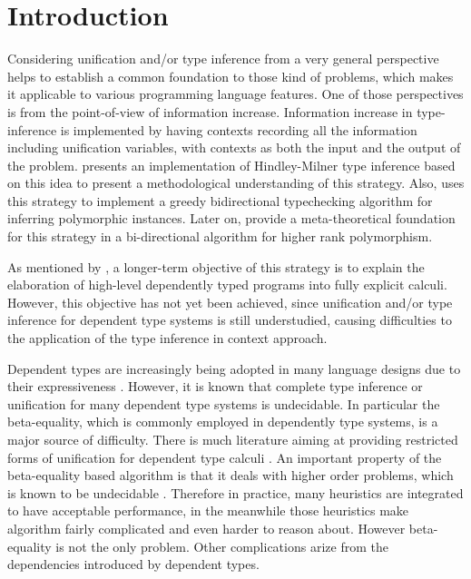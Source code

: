 \section{Introduction}

Considering unification and/or type inference from a very general perspective
helps to establish a common foundation to those kind of problems, which makes it
applicable to various programming language features. One of those
perspectives is from the point-of-view of information 
increase. Information increase in type-inference is implemented by having contexts recording all the
information including unification variables, with contexts as both the input and
the output of the problem. \citet{gundry2010type} presents an implementation of
Hindley-Milner \citep{damas1982principal,hindley69principal} type inference
based on this idea to present a methodological understanding of this strategy.
Also, \citet{dunfield2009greedy} uses this strategy to implement a greedy
bidirectional typechecking algorithm for inferring polymorphic instances. Later
on, \citet{dunfield2013complete} provide a meta-theoretical 
foundation for this strategy in a
bi-directional algorithm for higher rank polymorphism.

As mentioned by \citet{gundry2010type}, a longer-term objective of this strategy
is to explain the elaboration of high-level dependently typed programs into
fully explicit calculi. However, this objective has not yet been
achieved, since unification and/or type inference
for dependent type systems is still understudied, causing difficulties
to the application of the type inference in context approach.

Dependent types are increasingly being adopted in many language designs due to
their expressiveness \citep{xi1999dependent, licata2005formulation,
  pasalic2006concoqtion, mckinna2006dependent, norell2009dependently,
  brady2013idris}. However, it is known that complete type inference or
unification for many dependent type systems is undecidable. In particular the
beta-equality, which is commonly employed in dependently type systems, is a
major source of difficulty. There is much literature aiming at providing
restricted forms of unification for dependent type calculi
\citep{ziliani2015unification, abel2011higher, elliott1989higher}. An important
property of the beta-equality based algorithm is that it deals with higher order
problems, which is known to be undecidable \citep{goldfarb1981undecidability}.
Therefore in practice, many heuristics are integrated to have acceptable
performance, in the meanwhile those heuristics make algorithm fairly complicated
and even harder to reason about.   However beta-equality is not the
only problem. Other complications arize from the dependencies introduced by
dependent types.

